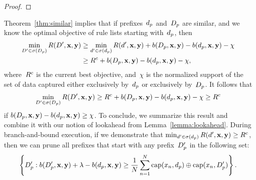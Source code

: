 \begin{arxiv}
\begin{proof}
\end{proof}

Theorem~\ref{thm:similar} implies that if prefixes~$d_p$
and~$D_p$ are similar, and we know the optimal objective
of rule lists starting with~$d_p$, then
\begin{align}
\min_{{D}' \in \sigma(D_p)} R({D}', \mathbf{x}, \mathbf{y})
&\ge \min_{{d}' \in \sigma(d_p)} R({d}', \mathbf{x}, \mathbf{y})
+ b(D_p, \mathbf{x}, \mathbf{y}) - b(d_p, \mathbf{x}, \mathbf{y}) - \chi \nonumber \\
&\ge {R^c} + b(D_p, \mathbf{x}, \mathbf{y}) - b(d_p, \mathbf{x}, \mathbf{y}) - \chi,
\end{align}
where~${R^c}$ is the current best objective,
and~$\chi$ is the normalized support of the set of data captured
either exclusively by~$d_p$ or exclusively by~$D_p$.
%
It follows that
\begin{align}
\min_{{D}' \in \sigma(D_p)} R({D}', \mathbf{x}, \mathbf{y})
\ge {R^c} + b(D_p, \mathbf{x}, \mathbf{y}) - b(d_p, \mathbf{x}, \mathbf{y}) - \chi \ge {R^c}
\end{align}
if ${b(D_p, \mathbf{x}, \mathbf{y}) - b(d_p, \mathbf{x}, \mathbf{y}) \ge \chi}$.
%
To conclude, we summarize this result and combine it with
our notion of lookahead from Lemma~\ref{lemma:lookahead}.
%
During branch-and-bound execution, if we demonstrate that
${\min_{{d}' \in \sigma(d_p)} R({d}', \mathbf{x}, \mathbf{y}) \ge {R^c}}$,
then we can prune all prefixes that start with any
prefix~$D_p'$ in the following set:
\begin{align}
\left\{ D_p' : b(D_p', \mathbf{x}, \mathbf{y}) + {\lambda} - b(d_p, \mathbf{x}, \mathbf{y}) \ge
\frac{1}{N} \sum_{n=1}^N \textnormal{cap}(x_n, d_p) \oplus \textnormal{cap}(x_n, D_p') \right\}.
\end{align}


\end{arxiv}
